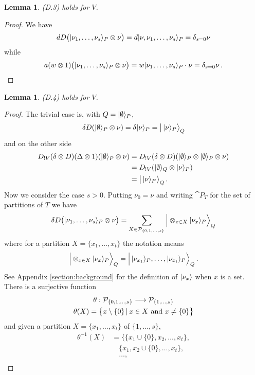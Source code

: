 \documentclass[english,letter paper,12pt,reqno]{article}
\DeclarePairedDelimiter\ket{\lvert}{\rangle}
\newtheorem{lemma}[theorem]{Lemma}
\theoremstyle{example}
\begin{document}
\begin{lemma} (D.3) holds for $V$.
\end{lemma}
\begin{proof}
We have
\[
d D\big( \ket{\nu_1,\ldots,\nu_s}_P \otimes \nu \big) = d\ket{\nu,\nu_1,\ldots,\nu_s}_P = \delta_{s=0} \nu
\]
while
\[
a( w \otimes 1 )\big( \ket{\nu_1,\ldots,\nu_s}_P \otimes \nu \big) = w\ket{\nu_1,\ldots,\nu_s}_P \cdot \nu = \delta_{s=0} \nu\,.
\]
\end{proof}

\begin{lemma} (D.4) holds for $V$.
\end{lemma}
\begin{proof}
The trivial case is, with $Q = \ket{\emptyset}_P$,
\[
\delta D( \ket{\emptyset}_P \otimes \nu ) = \delta\ket{\nu}_P = \big|\, \ket{\nu}_P \big\rangle_Q
\]
and on the other side
\begin{align*}
D_{{!} V}( \delta \otimes D )( \Delta \otimes 1)( \ket{\emptyset}_P \otimes \nu ) &= D_{{!} V}( \delta \otimes D)( \ket{\emptyset}_P \otimes \ket{\emptyset}_P \otimes \nu )\\
&= D_{{!} V}( \ket{\emptyset}_Q \otimes \ket{\nu}_P )\\
&= \big|\, \ket{\nu}_P \big\rangle_Q\,.
\end{align*}
Now we consider the case $s > 0$. Putting $\nu_0 = \nu$ and writing $\cat{P}_T$ for the set of partitions of $T$ we have
\[
\delta D\big(  \ket{\nu_1,\ldots,\nu_s}_P \otimes \nu \big) = \sum_{X \in \cat{P}_{\{0,1,\ldots,s\}}} \Big| \otimes_{x \in X} \ket{\nu_{x}}_P \Big\rangle_Q
\]
where for a partition $X = \{ x_1,\ldots,x_t \}$ the notation means
\[
\Big| \otimes_{x \in X} \ket{\nu_{x}}_P \Big\rangle_Q = \Big|\, \ket{\nu_{x_1}}_P, \ldots, \ket{\nu_{x_t}}_P \Big\rangle_Q\,. 
\]
See Appendix \ref{section:background} for the definition of $\ket{\nu_x}$ when $x$ is a set. There is a surjective function
\begin{gather*}
\theta: \mathcal{P}_{\{0,1,\ldots,s\}} \longrightarrow \mathcal{P}_{\{1,\ldots,s\}}\\
\theta( X ) = \big\{ x \setminus \{0\} \,|\, x \in X \text{ and } x \neq \{0\} \big\}
\end{gather*}
and given a partition $X = \{ x_1,\ldots,x_t \}$ of $\{1,\ldots,s\}$,
\begin{align*}
\theta^{-1}(X) &= \Big\{ \{ x_1 \cup \{0\}, x_2, \ldots, x_t \},\\
&\quad\{ x_1, x_2 \cup \{0\}, \ldots, x_t \},\\
&\quad\ldots,\\

\end{align*}
\end{proof}
\end{document}
